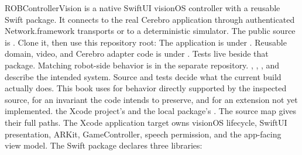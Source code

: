 \markdownRendererDocumentBegin
\markdownRendererSectionBegin
{}\markdownRendererInterblockSeparator
{}ROBControllerVision is a native SwiftUI visionOS controller with a reusable Swift package. It connects to the real Cerebro application through authenticated Network.framework transports or to a deterministic simulator. The public source is . Clone it, then use this repository root:\markdownRendererInterblockSeparator
{}\markdownRendererInterblockSeparator
{}The application is under . Reusable domain, video, and Cerebro adapter code is under . Tests live beside that package. Matching robot-side behavior is in the separate  repository.\markdownRendererInterblockSeparator
{}\markdownRendererBlockQuoteBegin
{} , , , and  describe the intended system. Source and tests decide what the current build actually does.\markdownRendererBlockQuoteEnd \markdownRendererInterblockSeparator
{}This book uses  for behavior directly supported by the inspected source,  for an invariant the code intends to preserve, and  for an extension not yet implemented.\markdownRendererInterblockSeparator
{}
\markdownRendererSectionEnd \markdownRendererSectionBegin
{}\markdownRendererInterblockSeparator
{}\markdownRendererBlockQuoteBegin
{} the Xcode project's  and the local package's . The source map gives their full paths.\markdownRendererBlockQuoteEnd \markdownRendererInterblockSeparator
{}The Xcode application target owns visionOS lifecycle, SwiftUI presentation, ARKit, GameController, speech permission, and the app-facing view model. The Swift package declares three libraries:\markdownRendererInterblockSeparator
